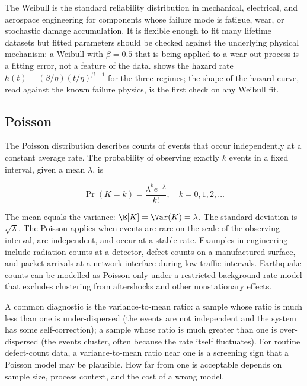The Weibull is the standard reliability distribution in mechanical,
electrical, and aerospace engineering for components whose failure
mode is fatigue, wear, or stochastic damage accumulation. It is
flexible enough to fit many lifetime datasets but fitted parameters
should be checked against the underlying physical mechanism: a
Weibull with $\beta = 0.5$ that is being applied to a wear-out
process is a fitting error, not a feature of the data.
 shows the hazard rate
$h(t) = (\beta/\eta)(t/\eta)^{\beta - 1}$ for the three regimes;
the shape of the hazard curve, read against the known failure
physics, is the first check on any Weibull fit.



\subsection{Poisson}

The Poisson distribution describes counts of events that occur
independently at a constant average rate. The probability of
observing exactly $k$ events in a fixed interval, given a mean
$\lambda$, is

\[
\Pr(K = k) = \frac{\lambda^{k} e^{-\lambda}}{k!}, \quad k = 0, 1, 2,
\ldots
\]

The mean equals the variance: $\E[K] = \Var(K) = \lambda$. The
standard deviation is $\sqrt{\lambda}$. The Poisson applies when
events are rare on the scale of the observing interval, are
independent, and occur at a stable rate. Examples in engineering
include radiation counts at a detector, defect counts on a
manufactured surface, and packet arrivals at a network interface
during low-traffic intervals. Earthquake counts can be modelled as
Poisson only under a restricted background-rate model that excludes
clustering from aftershocks and other nonstationary effects.

A common diagnostic is the variance-to-mean ratio: a sample whose
ratio is much less than one is under-dispersed (the events are not
independent and the system has some self-correction); a sample
whose ratio is much greater than one is over-dispersed (the events
cluster, often because the rate itself fluctuates). For routine
defect-count data, a variance-to-mean ratio near one is a screening
sign that a Poisson model may be plausible. How far from one is
acceptable depends on sample size, process context, and the cost of
a wrong model.

